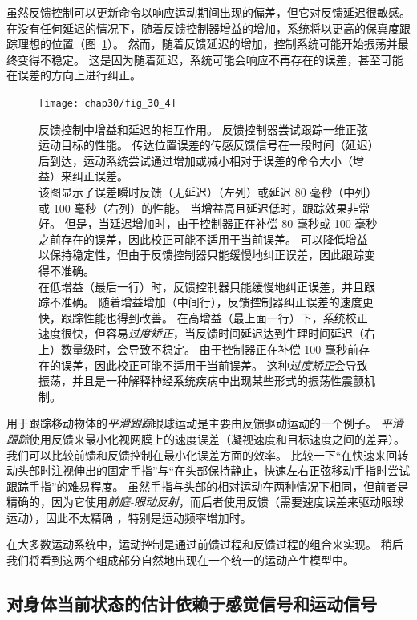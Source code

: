 虽然反馈控制可以更新命令以响应运动期间出现的偏差，但它对反馈延迟很敏感。
在没有任何延迟的情况下，随着反馈控制器增益的增加，系统将以更高的保真度跟踪理想的位置（图~\ref{fig:30_4}）。
然而，随着反馈延迟的增加，控制系统可能开始振荡并最终变得不稳定。
这是因为随着延迟，系统可能会响应不再存在的误差，甚至可能在误差的方向上进行纠正。


\begin{figure}[htbp]
	\centering
	\texttt{[image: chap30/fig\_30\_4]}
	\caption{反馈控制中增益和延迟的相互作用。
		反馈控制器尝试跟踪一维正弦运动目标的性能。
		传达位置误差的传感反馈信号在一段时间（延迟）后到达，运动系统尝试通过增加或减小相对于误差的命令大小（增益）来纠正误差。\\
		该图显示了误差瞬时反馈（无延迟）（左列）或延迟 80 毫秒（中列）或 100 毫秒（右列）的性能。
		当增益高且延迟低时，跟踪效果非常好。
		但是，当延迟增加时，由于控制器正在补偿 80 毫秒或 100 毫秒之前存在的误差，因此校正可能不适用于当前误差。
		可以降低增益以保持稳定性，但由于反馈控制器只能缓慢地纠正误差，因此跟踪变得不准确。\\
		在低增益（最后一行）时，反馈控制器只能缓慢地纠正误差，并且跟踪不准确。
		随着增益增加（中间行），反馈控制器纠正误差的速度更快，跟踪性能也得到改善。
		在高增益（最上面一行）下，系统校正速度很快，但容易\textit{过度矫正}，当反馈时间延迟达到生理时间延迟（右上）数量级时，会导致不稳定。
		由于控制器正在补偿 100 毫秒前存在的误差，因此校正可能不适用于当前误差。
		这种\textit{过度矫正}会导致振荡，并且是一种解释神经系统疾病中出现某些形式的振荡性震颤机制。}
	\label{fig:30_4}
\end{figure}


用于跟踪移动物体的\textit{平滑跟踪}眼球运动是主要由反馈驱动运动的一个例子。
\textit{平滑跟踪}使用反馈来最小化视网膜上的速度误差（凝视速度和目标速度之间的差异）。
我们可以比较前馈和反馈控制在最小化误差方面的效率。
比较一下“在快速来回转动头部时注视伸出的固定手指”与“在头部保持静止，快速左右正弦移动手指时尝试跟踪手指”的难易程度。
虽然手指与头部的相对运动在两种情况下相同，但前者是精确的，因为它使用\textit{前庭-眼动反射}，而后者使用反馈（需要速度误差来驱动眼球运动），因此不太精确 ，特别是运动频率增加时。


在大多数运动系统中，运动控制是通过前馈过程和反馈过程的组合来实现。
稍后我们将看到这两个组成部分自然地出现在一个统一的运动产生模型中。



\subsection{对身体当前状态的估计依赖于感觉信号和运动信号}

